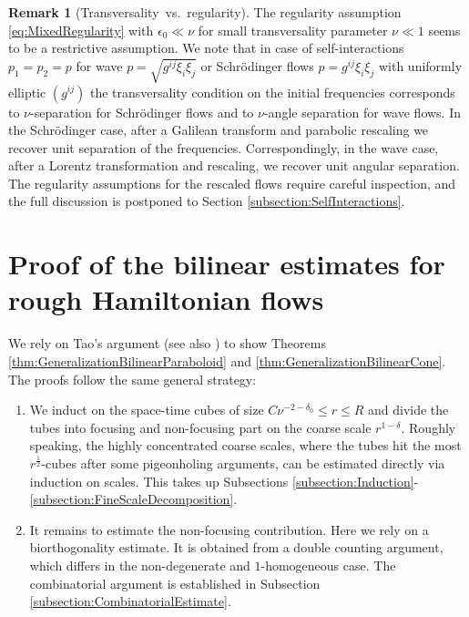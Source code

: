 \documentclass{amsart}
\theoremstyle{definition}
\newtheorem{remark}[theorem]{Remark}
\begin{document}
\begin{remark}[Transversality~vs.~regularity]
The regularity assumption \eqref{eq:MixedRegularity} with $\epsilon_0 \ll \nu$ for small transversality parameter $\nu \ll 1$ seems to be a restrictive assumption. We note that in case of self-interactions $p_1 = p_2=p$ for wave $p= \sqrt{g^{ij} \xi_i \xi_j}$ or Schr\"odinger flows $p = g^{ij} \xi_i \xi_j$ with uniformly elliptic $(g^{ij})$ the transversality condition on the initial frequencies corresponds to $\nu$-separation for Schr\"odinger flows and to $\nu$-angle separation for wave flows. In the Schr\"odinger case, after a Galilean transform and  parabolic rescaling we recover unit separation of the frequencies. Correspondingly, in the wave case, after a Lorentz transformation and rescaling, we recover unit angular separation. The regularity assumptions for the rescaled flows require careful inspection, and the full discussion is postponed to Section \ref{subsection:SelfInteractions}.
\end{remark}

\section{Proof of the bilinear estimates for rough Hamiltonian flows}
\label{section:ProofBilinear}

We rely on Tao's argument \cite{Tao03} (see also \cite{Lee2006}) to show Theorems \ref{thm:GeneralizationBilinearParaboloid} and \ref{thm:GeneralizationBilinearCone}. The proofs follow the same general strategy:
\begin{enumerate}
\item We induct on the space-time cubes of size $C \nu^{-2-\delta_0} \leq r \leq R$ and divide the tubes into focusing and non-focusing part on the coarse scale $r^{1-\delta}$. 
Roughly speaking, the highly concentrated coarse scales, where the tubes hit the most $r^{\frac{1}{2}}$-cubes after some pigeonholing arguments, can be estimated directly via induction on scales. This takes up Subsections \ref{subsection:Induction}-\ref{subsection:FineScaleDecomposition}.
\item It remains to estimate the non-focusing contribution. Here we rely on a biorthogonality estimate. It is obtained from a double counting argument, which differs in the non-degenerate and $1$-homogeneous case. The combinatorial argument is established in Subsection \ref{subsection:CombinatorialEstimate}.
\end{enumerate}
\end{document}
